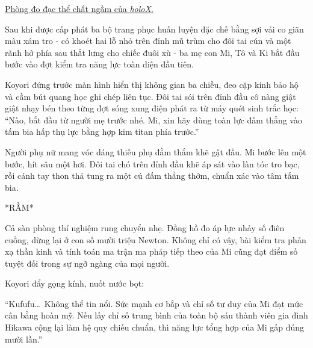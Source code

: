 \documentclass[../main.tex]{subfiles}
\begin{document}

\begin{center}
    \uline{Phòng đo đạc thể chất ngầm của \textit{holoX}.}
\end{center}

Sau khi được cấp phát ba bộ trang phục huấn luyện đặc chế bằng sợi vải co giãn màu xám tro - có khoét hai lỗ nhỏ trên đỉnh mũ trùm cho đôi tai cún và một rãnh hở phía sau thắt lưng cho chiếc đuôi xù - ba mẹ con Mi, Tô và Ki bắt đầu bước vào đợt kiểm tra năng lực toàn diện đầu tiên.

Koyori đứng trước màn hình hiển thị không gian ba chiều, đeo cặp kính bảo hộ và cầm bút quang học ghi chép liên tục. Đôi tai sói trên đỉnh đầu cô nàng giật giật nhạy bén theo từng đợt sóng xung điện phát ra từ máy quét sinh trắc học: ``Nào, bắt đầu từ người mẹ trước nhé. Mi, xin hãy dùng toàn lực đấm thẳng vào tấm bia hấp thụ lực bằng hợp kim titan phía trước.''

Người phụ nữ mang vóc dáng thiếu phụ đằm thắm khẽ gật đầu. Mi bước lên một bước, hít sâu một hơi. Đôi tai chó trên đỉnh đầu khẽ áp sát vào làn tóc tro bạc, rồi cánh tay thon thả tung ra một cú đấm thẳng thớm, chuẩn xác vào tâm tấm bia.

*RẦM*

Cả sàn phòng thí nghiệm rung chuyển nhẹ. Đồng hồ đo áp lực nhảy số điên cuồng, dừng lại ở con số mười triệu Newton. Không chỉ có vậy, bài kiểm tra phản xạ thần kinh và tính toán ma trận ma pháp tiếp theo của Mi cũng đạt điểm số tuyệt đối trong sự ngỡ ngàng của mọi người.

Koyori đẩy gọng kính, nuốt nước bọt:

``Kufufu\dots\ Không thể tin nổi. Sức mạnh cơ bắp và chỉ số tư duy của Mi đạt mức cân bằng hoàn mỹ. Nếu lấy chỉ số trung bình của toàn bộ sáu thành viên gia đình Hikawa cộng lại làm hệ quy chiếu chuẩn, thì năng lực tổng hợp của Mi gấp đúng mười lần.''
\end{document}
